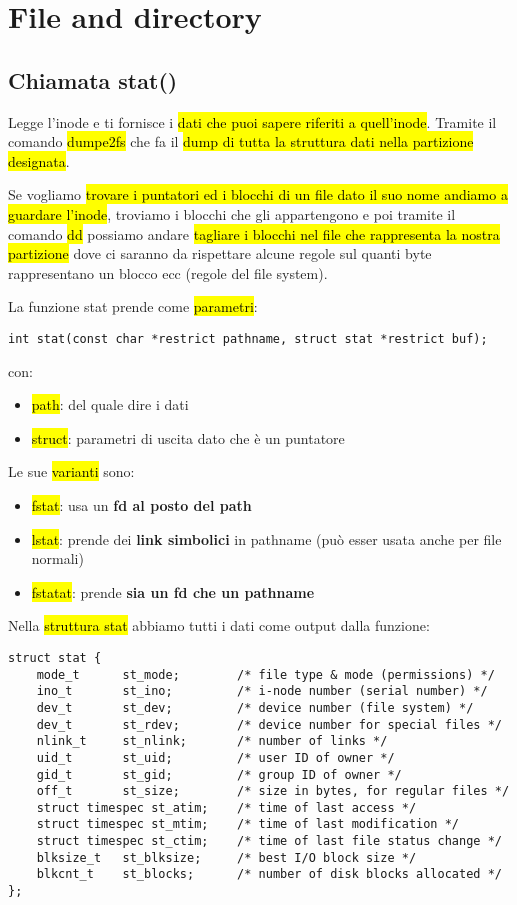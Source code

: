 \newpage
\section{File and directory}

\subsection{Chiamata stat()}

Legge l'inode e ti fornisce i \hl{dati che puoi sapere riferiti a quell'inode}. Tramite il comando \hl{dumpe2fs} che fa il \hl{dump di tutta la struttura dati nella partizione designata}.

Se vogliamo \hl{trovare i puntatori ed i blocchi di un file dato il suo nome andiamo a guardare l'inode}, troviamo i blocchi che gli appartengono e poi tramite il comando \hl{dd} possiamo andare \hl{tagliare i blocchi nel file che rappresenta la nostra partizione} dove ci saranno da rispettare alcune regole sul quanti byte rappresentano un blocco ecc (regole del file system).

La funzione stat prende come \hl{parametri}:

\begin{lstlisting}
int stat(const char *restrict pathname, struct stat *restrict buf);
\end{lstlisting}

con:

\begin{itemize}
    \item \hl{path}: del quale dire i dati
    \item \hl{struct}: parametri di uscita dato che è un puntatore
\end{itemize}


Le sue \hl{varianti} sono:

\begin{itemize}
    \item \hl{fstat}: usa un \textbf{fd al posto del path}
    \item \hl{lstat}: prende dei \textbf{link simbolici} in pathname (può esser usata anche per file normali)
    \item \hl{fstatat}: prende \textbf{sia un fd che un pathname}
\end{itemize}

Nella \hl{struttura stat} abbiamo tutti i dati come output dalla funzione:

\begin{lstlisting}
struct stat {
	mode_t		st_mode;		/* file type & mode (permissions) */
	ino_t		st_ino;			/* i-node number (serial number) */
	dev_t		st_dev;			/* device number (file system) */
	dev_t		st_rdev;		/* device number for special files */
	nlink_t		st_nlink;		/* number of links */
	uid_t		st_uid;			/* user ID of owner */
	gid_t		st_gid;			/* group ID of owner */
	off_t		st_size;		/* size in bytes, for regular files */
	struct timespec st_atim;	/* time of last access */
	struct timespec st_mtim;	/* time of last modification */
	struct timespec st_ctim;	/* time of last file status change */
	blksize_t	st_blksize;		/* best I/O block size */
	blkcnt_t	st_blocks;		/* number of disk blocks allocated */
};
\end{lstlisting}